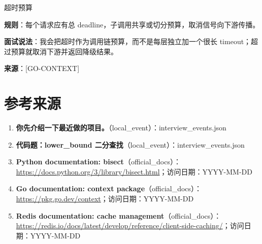 \documentclass[a4paper,11pt]{article}
\begin{document}
\begin{drillbox}{超时预算}

\textbf{规则}：每个请求应有总 deadline，子调用共享或切分预算，取消信号向下游传播。



\textbf{面试说法}：我会把超时作为调用链预算，而不是每层独立加一个很长 timeout；超过预算就取消下游并返回降级结果。



\textbf{来源}：[GO-CONTEXT]

\end{drillbox}

\section{参考来源}
\begin{enumerate}
\item [L-q01] \textbf{你先介绍一下最近做的项目。}（local\_event）：interview\_events.json
\item [L-code01] \textbf{代码题：lower\_bound 二分查找}（local\_event）：interview\_events.json
\item [PY-BISECT] \textbf{Python documentation: bisect}（official\_docs）：\url{https://docs.python.org/3/library/bisect.html}；访问日期：YYYY-MM-DD
\item [GO-CONTEXT] \textbf{Go documentation: context package}（official\_docs）：\url{https://pkg.go.dev/context}；访问日期：YYYY-MM-DD
\item [REDIS-CACHE] \textbf{Redis documentation: cache management}（official\_docs）：\url{https://redis.io/docs/latest/develop/reference/client-side-caching/}；访问日期：YYYY-MM-DD
\end{enumerate}
\end{document}
